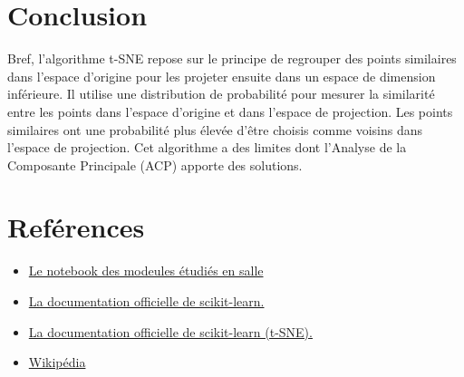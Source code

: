 \documentclass[12pt,a4paper]{article}
\begin{document}
	\newpage
	\section*{Conclusion}
	Bref, l'algorithme t-SNE repose sur le principe de regrouper des points similaires dans l'espace d'origine pour les projeter ensuite dans un espace de dimension inférieure. Il utilise une distribution de probabilité pour mesurer la similarité entre les points dans l'espace d'origine et dans l'espace de projection. Les points similaires ont une probabilité plus élevée d'être choisis comme voisins dans l'espace de projection. Cet algorithme a des limites dont l'Analyse de la Composante Principale (ACP) apporte des solutions.
	
	\newpage
	\section*{Reférences}
	\begin{itemize}
		\item \href{https://colab.research.google.com/drive/1wW0akEQlZ_hec1TPh8b_8HVYwXHHp1_A?usp=sharing}{Le notebook des modeules étudiés en salle}
		\item \href{https://scikit-learn.org/stable/modules/generated/sklearn.manifold.TSNE.html}{La documentation officielle de scikit-learn.}
		\item \href{https://scikit-learn.org/stable/modules/manifold.html\#t-sne}{La documentation officielle de scikit-learn (t-SNE).}
		\item \href{https://fr.wikipedia.org/wiki/Algorithme\_t-SNE}{Wikipédia}
	\end{itemize}
\end{document}
